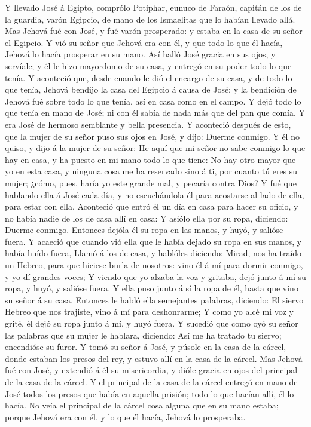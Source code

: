  Y llevado José á Egipto, comprólo Potiphar, eunuco de
Faraón, capitán de los de la guardia, varón Egipcio, de mano de los
Ismaelitas que lo habían llevado allá.  Mas Jehová fué con
José, y fué varón prosperado: y estaba en la casa de su señor el
Egipcio.  Y vió su señor que Jehová era con él, y que todo
lo que él hacía, Jehová lo hacía prosperar en su mano. 
Así halló José gracia en sus ojos, y servíale; y él le hizo mayordomo de
su casa, y entregó en su poder todo lo que tenía.  Y
aconteció que, desde cuando le dió el encargo de su casa, y de todo lo
que tenía, Jehová bendijo la casa del Egipcio á causa de José; y la
bendición de Jehová fué sobre todo lo que tenía, así en casa como en el
campo.  Y dejó todo lo que tenía en mano de José; ni con
él sabía de nada más que del pan que comía. Y era José de hermoso
semblante y bella presencia.  Y aconteció después de esto,
que la mujer de su señor puso sus ojos en José, y dijo: Duerme conmigo.
 Y él no quiso, y dijo á la mujer de su señor: He aquí que
mi señor no sabe conmigo lo que hay en casa, y ha puesto en mi mano todo
lo que tiene:  No hay otro mayor que yo en esta casa, y
ninguna cosa me ha reservado sino á ti, por cuanto tú eres su mujer;
¿cómo, pues, haría yo este grande mal, y pecaría contra Dios?
 Y fué que hablando ella á José cada día, y no
escuchándola él para acostarse al lado de ella, para estar con ella,
 Aconteció que entró él un día en casa para hacer su
oficio, y no había nadie de los de casa allí en casa:  Y
asiólo ella por su ropa, diciendo: Duerme conmigo. Entonces dejóla él su
ropa en las manos, y huyó, y salióse fuera.  Y acaeció
que cuando vió ella que le había dejado su ropa en sus manos, y había
huído fuera,  Llamó á los de casa, y hablóles diciendo:
Mirad, nos ha traído un Hebreo, para que hiciese burla de nosotros: vino
él á mí para dormir conmigo, y yo dí grandes voces;  Y
viendo que yo alzaba la voz y gritaba, dejó junto á mí su ropa, y huyó,
y salióse fuera.  Y ella puso junto á sí la ropa de él,
hasta que vino su señor á su casa.  Entonces le habló
ella semejantes palabras, diciendo: El siervo Hebreo que nos trajiste,
vino á mí para deshonrarme;  Y como yo alcé mi voz y
grité, él dejó su ropa junto á mí, y huyó fuera.  Y
sucedió que como oyó su señor las palabras que su mujer le hablara,
diciendo: Así me ha tratado tu siervo; encendióse su furor.
 Y tomó su señor á José, y púsole en la casa de la
cárcel, donde estaban los presos del rey, y estuvo allí en la casa de la
cárcel.  Mas Jehová fué con José, y extendió á él su
misericordia, y dióle gracia en ojos del principal de la casa de la
cárcel.  Y el principal de la casa de la cárcel entregó
en mano de José todos los presos que había en aquella prisión; todo lo
que hacían allí, él lo hacía.  No veía el principal de la
cárcel cosa alguna que en su mano estaba; porque Jehová era con él, y lo
que él hacía, Jehová lo prosperaba.

